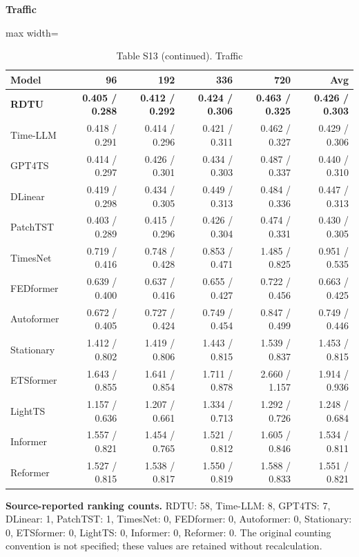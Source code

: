 \begin{table}[H]\centering\small
\caption*{Table S13 (continued). Traffic}
\textbf{Traffic}\par\smallskip
\begin{adjustbox}{max width=\linewidth}\begin{tabular}{lrrrrr}\toprule
\textbf{Model} & \textbf{96} & \textbf{192} & \textbf{336} & \textbf{720} & \textbf{Avg}\\\midrule
\rowcolor{blue!5}
\textbf{RDTU} & \textbf{0.405 / 0.288} & \textbf{0.412 / 0.292} & \textbf{0.424 / 0.306} & \textbf{0.463 / 0.325} & \textbf{0.426 / 0.303}\\
Time-LLM & 0.418 / 0.291 & 0.414 / 0.296 & 0.421 / 0.311 & 0.462 / 0.327 & 0.429 / 0.306\\
GPT4TS & 0.414 / 0.297 & 0.426 / 0.301 & 0.434 / 0.303 & 0.487 / 0.337 & 0.440 / 0.310\\
DLinear & 0.419 / 0.298 & 0.434 / 0.305 & 0.449 / 0.313 & 0.484 / 0.336 & 0.447 / 0.313\\
PatchTST & 0.403 / 0.289 & 0.415 / 0.296 & 0.426 / 0.304 & 0.474 / 0.331 & 0.430 / 0.305\\
TimesNet & 0.719 / 0.416 & 0.748 / 0.428 & 0.853 / 0.471 & 1.485 / 0.825 & 0.951 / 0.535\\
FEDformer & 0.639 / 0.400 & 0.637 / 0.416 & 0.655 / 0.427 & 0.722 / 0.456 & 0.663 / 0.425\\
Autoformer & 0.672 / 0.405 & 0.727 / 0.424 & 0.749 / 0.454 & 0.847 / 0.499 & 0.749 / 0.446\\
Stationary & 1.412 / 0.802 & 1.419 / 0.806 & 1.443 / 0.815 & 1.539 / 0.837 & 1.453 / 0.815\\
ETSformer & 1.643 / 0.855 & 1.641 / 0.854 & 1.711 / 0.878 & 2.660 / 1.157 & 1.914 / 0.936\\
LightTS & 1.157 / 0.636 & 1.207 / 0.661 & 1.334 / 0.713 & 1.292 / 0.726 & 1.248 / 0.684\\
Informer & 1.557 / 0.821 & 1.454 / 0.765 & 1.521 / 0.812 & 1.605 / 0.846 & 1.534 / 0.811\\
Reformer & 1.527 / 0.815 & 1.538 / 0.817 & 1.550 / 0.819 & 1.588 / 0.833 & 1.551 / 0.821\\
\bottomrule\end{tabular}\end{adjustbox}\end{table}
\noindent\textbf{Source-reported ranking counts.} RDTU: 58, Time-LLM: 8, GPT4TS: 7, DLinear: 1, PatchTST: 1, TimesNet: 0, FEDformer: 0, Autoformer: 0, Stationary: 0, ETSformer: 0, LightTS: 0, Informer: 0, Reformer: 0. The original counting convention is not specified; these values are retained without recalculation.\par
